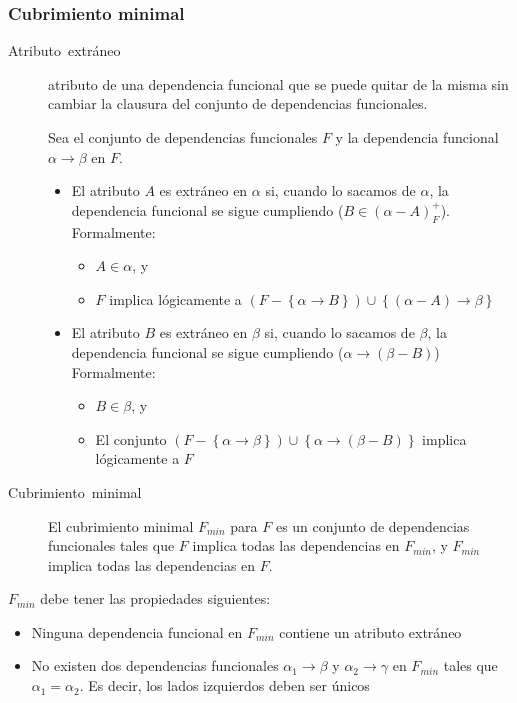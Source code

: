 \documentclass[a4paper, twoside]{article}
\begin{document}
\subsubsection{Cubrimiento minimal}
\begin{description}
\item [{Atributo~extráneo}] atributo de una dependencia funcional que
se puede quitar de la misma sin cambiar\emph{ }la clausura del conjunto
de dependencias funcionales. 


Sea el conjunto de dependencias funcionales $F$ y la dependencia
funcional $\alpha\to\beta$ en $F$.
\begin{itemize}
\item El atributo $A$ es extráneo en $\alpha$ si, cuando lo sacamos de
$\alpha$, la dependencia funcional se sigue cumpliendo ($B\in(\alpha-A)_{F}^{+}$).
Formalmente:

\begin{itemize}
\item $A\in\alpha$, y
\item $F$ implica lógicamente a $\left(F-\left\{ \alpha\to B\right\} \right)\cup\left\{ \left(\alpha-A\right)\to\beta\right\} $
\end{itemize}
\item El atributo $B$ es extráneo en $\beta$ si, cuando lo sacamos de
$\beta$, la dependencia funcional se sigue cumpliendo ($\alpha\to(\beta-B)$)
Formalmente:

\begin{itemize}
\item $B\in\beta$, y
\item El conjunto $\left(F-\left\{ \alpha\to\beta\right\} \right)\cup\left\{ \alpha\to\left(\beta-B\right)\right\} $
implica lógicamente a $F$
\end{itemize}
\end{itemize}
\item [{Cubrimiento~minimal}] El cubrimiento minimal $F_{min}$ para $F$
es un conjunto de dependencias funcionales tales que $F$ implica
todas las dependencias en $F_{min}$, y $F_{min}$ implica todas las
dependencias en $F$. 
\end{description}
$F_{min}$ debe tener las propiedades siguientes:
\begin{itemize}
\item Ninguna dependencia funcional en $F_{min}$ contiene un atributo extráneo
\item No existen dos dependencias funcionales $\alpha_{1}\to\beta$ y $\alpha_{2}\to\gamma$
en $F_{min}$ tales que $\alpha_{1}=\alpha_{2}$. Es decir, los lados
izquierdos deben ser únicos
\end{itemize}
\end{document}
